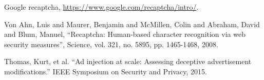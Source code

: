 \documentclass[runningheads]{llncs}
\begin{document}
\begin{thebibliography}{1}
 Google recaptcha, \url{https://www.google.com/recaptcha/intro/}.

 Von Ahn, Luis and Maurer, Benjamin and McMillen, Colin and Abraham, David and Blum, Manuel, ``Recaptcha: Human-based character recognition via web security measures'', Science, vol. 321, no. 5895, pp. 1465-1468, 2008.

 Thomas, Kurt, et al. ``Ad injection at scale: Assessing deceptive advertisement modifications.'' IEEE Symposium on Security and Privacy, 2015.

\end{thebibliography}

\addtolength{\textheight}{-7cm}
\balance


\end{document}

